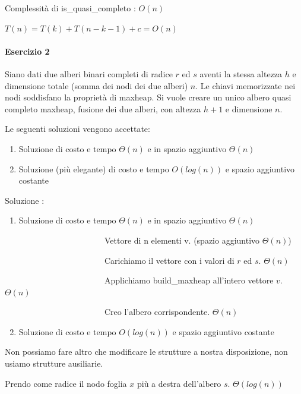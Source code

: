 \documentclass{article}
\providecommand{\tightlist}{%
  \setlength{\itemsep}{0pt}\setlength{\parskip}{0pt}}
\let\oldparagraph\paragraph
\renewcommand{\paragraph}[1]{\oldparagraph{#1}\mbox{}}
\begin{document}
{



{Complessità di is\_quasi\_completo : $O(n)$}

$T(n) = T(k) + T(n-k-1) + c = O(n)$

\paragraph{Esercizio 2}

{Siano dati due alberi binari completi di radice $r$ ed $s$ aventi la stessa altezza $h$ e dimensione totale (somma dei nodi dei due alberi) $n$. Le chiavi memorizzate nei nodi soddisfano la proprietà di maxheap. Si vuole creare un unico albero quasi completo maxheap, fusione dei due alberi, con altezza $h+1$ e dimensione $n$.}

{Le seguenti soluzioni vengono accettate:}

\begin{enumerate}
\tightlist
\item
  {Soluzione di costo e tempo $\Theta(n)$ e in spazio aggiuntivo $\Theta(n)$}
\item
  {Soluzione (più elegante) di costo e tempo $O(log(n))$ e spazio aggiuntivo costante}
\end{enumerate}

{Soluzione :}

\begin{enumerate}
\tightlist
\item
  {Soluzione di costo e tempo $\Theta(n)$ e in spazio aggiuntivo $\Theta(n)$}
\end{enumerate}

{~~~~~~~~~~~~~~~~~~~~~~~~Vettore di n elementi v. (spazio aggiuntivo $\Theta(n)$)}

{~~~~~~~~~~~~~~~~~~~~~~~~Carichiamo il vettore con i valori di $r$ ed $s$. $\Theta(n)$}

{~~~~~~~~~~~~~~~~~~~~~~~~Applichiamo build\_maxheap all'intero vettore $v$. $\Theta(n)$}

{~~~~~~~~~~~~~~~~~~~~~~~~Creo l'albero corrispondente. $\Theta(n)$}

\begin{enumerate}
\setcounter{enumi}{1}
\tightlist
\item
  {Soluzione di costo e tempo $O(log(n))$ e spazio aggiuntivo costante}
\end{enumerate}

{Non possiamo fare altro che modificare le strutture a nostra disposizione, non usiamo strutture ausiliarie.}

{Prendo come radice il nodo foglia $x$ più a destra dell'albero $s$. $\Theta(log(n))$}}
\end{document}
